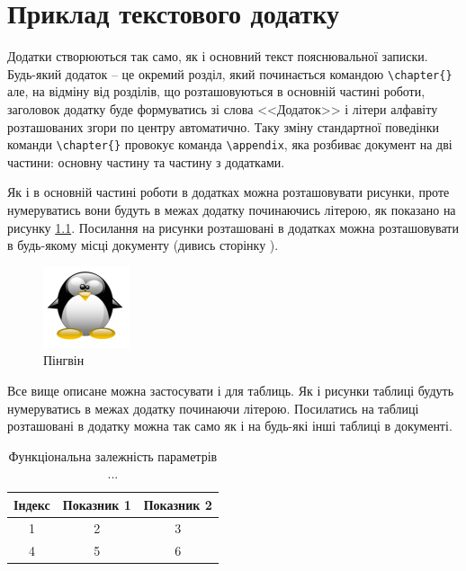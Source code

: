 \chapter[(Довідковий) Приклад текстового додатку]{Приклад текстового додатку}
\label{apdx:text}

Додатки створюються так само, як і основний текст пояснювальної записки. Будь-який додаток -- це окремий розділ, який
починається командою \verb|\chapter{}| але, на відміну від розділів, що розташовуються в основній частині роботи, заголовок
додатку буде формуватись зі слова <<Додаток>>  і літери алфавіту розташованих згори по центру автоматично. Таку зміну
стандартної поведінки команди \verb|\chapter{}| провокує команда \verb|\appendix|, яка розбиває документ на дві частини: 
основну частину та частину з додатками.

Як і в основній частині роботи в додатках можна розташовувати рисунки, проте нумеруватись вони будуть в межах додатку
починаючись літерою, як показано на рисунку \ref{apdxfig:tux}. Посилання на рисунки розташовані в додатках можна розташовувати 
в будь-якому місці документу (дивись сторінку \pageref{linkpage}).


\begin{figure}[h]
 \centering\includegraphics{img/Tux.png}
 \caption{Пінгвін}
 \label{apdxfig:tux}
\end{figure}

Все вище описане можна застосувати і для таблиць. Як і рисунки таблиці будуть нумеруватись в межах додатку починаючи літерою.
Посилатись на таблиці розташовані в додатку можна так само як і на будь-які інші таблиці в документі. 

\begin{table}[h]
\caption{\label{apdxtable:1}Функціональна залежність параметрів ...}
 \begin{tabular}{|c|c|c|}
 \hline 
 Індекс & Показник 1 & Показник 2\tabularnewline
 \hline\hline 
 1      & 2          & 3         \tabularnewline
 \hline
 4      & 5          & 6         \tabularnewline
 \hline 
\end{tabular}
\end{table}
  


